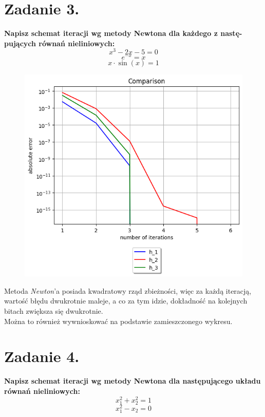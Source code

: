 \documentclass{article}
\begin{document}
\section*{Zadanie 3.}
\textbf{Napisz schemat iteracji wg metody Newtona dla każdego z nastę-
pujących równań nieliniowych:
$$x^3-2x-5=0$$
$$e^{-x} = x$$
$$x\cdot\sin(x) = 1$$}

\begin{figure}[H]
  \includegraphics[width=\linewidth]{figures/comparison.png}
\end{figure}

Metoda \textit{Newton}'a posiada kwadratowy rząd zbieżności, więc za każdą iteracją,
wartość błędu dwukrotnie maleje, a co za tym idzie, dokładność na kolejnych bitach zwiększa się dwukrotnie.\\
Można to również wywnioskować na podstawie zamieszczonego wykresu.

\section*{Zadanie 4.}
\textbf{Napisz schemat iteracji wg metody Newtona dla następującego
układu równań nieliniowych:
$$x_1^2 + x_2^2 = 1$$
$$x_1^2 - x_2 = 0$$}
\end{document}
